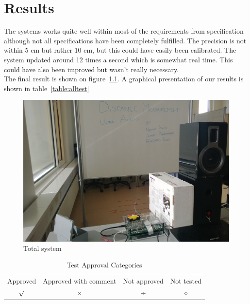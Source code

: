 \chapter{Results}
The systems works quite well within most of the requirements from specification although not all specifications have been completely fulfilled. The precision is not within 5 cm but rather 10 cm, but this could have easily been calibrated. The system updated around 12 times a second which is somewhat real time. This could have also been improved but wasn't really necessary.\\
The final result is shown on figure~\ref{fig:totalsys}. A graphical presentation of our results is shown in table~\ref{table:alltest}
\begin{figure}[hbpt]
\centering
\includegraphics[scale=0.2]{billeder/totalsys}
\caption{Total system}
\label{fig:totalsys}
\end{figure}

\begin{table}[H]
\centering
\begin{tabular}{c c c c}
\hline
Approved & Approved with comment & Not approved & Not tested \\
$\surd$ & $\times$ & $\div$ & $\diamond$ \\\hline
\end{tabular}
\caption{Test Approval Categories}
\end{table}

